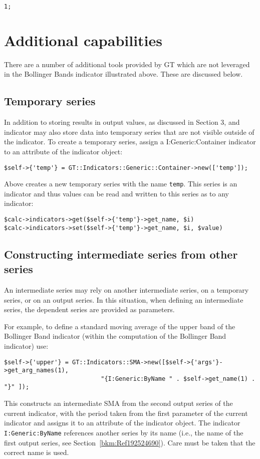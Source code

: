 \documentclass[11pt,twoside]{article}
\begin{document}
\begin{lstlisting}[name=example]
1;
\end{lstlisting}

\section{Additional capabilities}
There are a number of additional tools provided by GT which are not
leveraged in the Bollinger Bands indicator illustrated above. These are
discussed below.

\subsection[Temporary series]{\label{bkm:Ref192502379}Temporary series}
In addition to storing results in output values, as discussed in Section
3, and indicator may also store data into temporary series that are not
visible outside of the indicator. To create a temporary series, assign
a I:Generic:Container indicator to an attribute of the indicator
object:
\begin{lstlisting}[numbers=none]
$self->{'temp'} = GT::Indicators::Generic::Container->new(['temp']);
\end{lstlisting}

Above creates a new temporary series with the name
\lstinline!temp!. This series is an indicator and thus values
can be read and written to this series as to any indicator:
\begin{lstlisting}[numbers=none]
$calc->indicators->get($self->{'temp'}->get_name, $i)
$calc->indicators->set($self->{'temp'}->get_name, $i, $value)
\end{lstlisting}

\subsection[Constructing intermediate series from other
series]{\label{bkm:Ref192502529}Constructing intermediate series from
other series}
An intermediate series may rely on another intermediate series, on a
temporary series, or on an output series. In this situation, when
defining an intermediate series, the dependent series are provided as
parameters.

For example, to define a standard moving average of the upper band of
the Bollinger Band indicator (within the computation of the Bollinger Band indicator) use:
\begin{lstlisting}[numbers=none]
$self->{'upper'} = GT::Indicators::SMA->new([$self->{'args'}->get_arg_names(1),
                           "{I:Generic:ByName " . $self->get_name(1) . "}" ]);
\end{lstlisting}
This constructs an intermediate SMA from the second output series of
the current indicator, with the period taken from the first parameter
of the current indicator and assigns it to an attribute of the
indicator object. The indicator \lstinline!I:Generic:ByName! references
another series by its name (i.e., the name of the first output series, 
see Section~\ref{bkm:Ref192524690}). Care must be taken that the correct
name is used.
\end{document}
